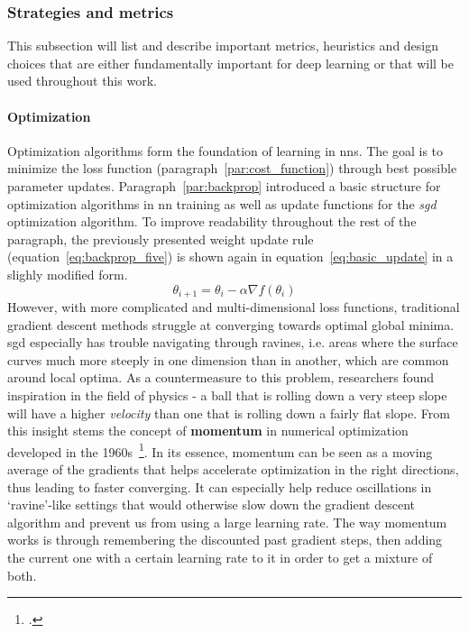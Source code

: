 \subsubsection{Strategies and metrics}
\label{sub:strategies_and_metrics}

This subsection will list and describe important metrics, heuristics and design choices that are either fundamentally important for deep learning or that will be used throughout this work.

\paragraph{Optimization}
Optimization algorithms form the foundation of learning in \gls{nn}s. The goal is to minimize the loss function (paragraph~\ref{par:cost_function}) through best possible parameter updates. Paragraph~\ref{par:backprop} introduced a basic structure for optimization algorithms in \gls{nn} training as well as update functions for the \textit{\gls{sgd}} optimization algorithm. To improve readability throughout the rest of the paragraph, the previously presented weight update rule (equation~\ref{eq:backprop_five}) is shown again in equation~\ref{eq:basic_update} in a slighly modified form.
\begin{equation}
	\label{eq:basic_update}
	\theta_{i+1} = \theta_{i} - \alpha \nabla f(\theta_i)
\end{equation}
However, with more complicated and multi-dimensional loss functions, traditional gradient descent methods struggle at converging towards optimal global minima. \gls{sgd} especially has trouble navigating through ravines, i.e. areas where the surface curves much more steeply in one dimension than in another, which are common around local optima. As a countermeasure to this problem, researchers found inspiration in the field of physics - a ball that is rolling down a very steep slope will have a higher \textit{velocity} than one that is rolling down a fairly flat slope. From this insight stems the concept of \textbf{momentum} in numerical optimization developed in the 1960s~\footcite{10.5555/3042817.3043064}. In its essence, momentum can be seen as a moving average of the gradients that helps accelerate optimization in the right directions, thus leading to faster converging. It can especially help reduce oscillations in `ravine'-like settings that would otherwise slow down the gradient descent algorithm and prevent us from using a large learning rate. The way momentum works is through remembering the discounted past gradient steps, then adding the current one with a certain learning rate to it in order to get a mixture of both.
